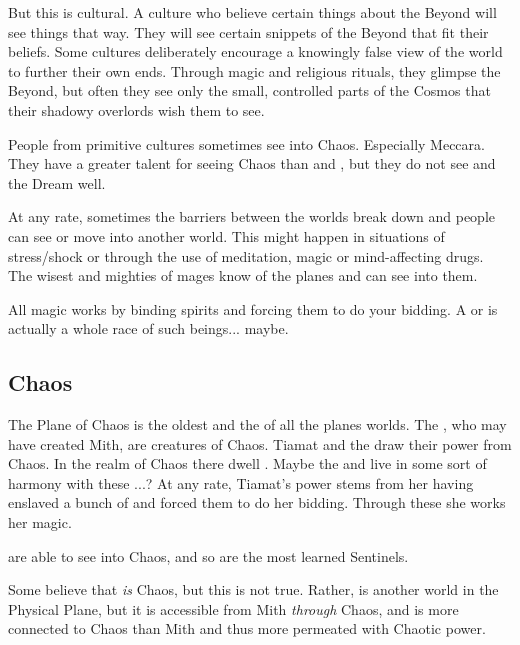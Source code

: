 But this is cultural. A culture who believe certain things about the Beyond will see things that way. They will see certain snippets of the Beyond that fit their beliefs. Some cultures deliberately encourage a knowingly false view of the world to further their own ends. Through magic and religious rituals, they glimpse the Beyond, but often they see only the small, controlled parts of the Cosmos that their shadowy overlords wish them to see. 

People from primitive cultures sometimes see into Chaos. Especially Meccara. They have a greater talent for seeing Chaos than \humans{} and \scathae{}, but they do not see \Nyx{} and the Dream well. 


At any rate, sometimes the barriers between the worlds break down and people can see or move into another world. This might happen in situations of stress/shock or through the use of meditation, magic or mind-affecting drugs. The wisest and mighties of mages know of the planes and can see into them. 

All magic works by binding spirits and forcing them to do your bidding. A \Sephirah{} or \Kliffah{} is actually a whole race of such beings... maybe. 

\subsection{Chaos}
The Plane of Chaos is the oldest and the  of all the planes worlds. 
The \krakens{}, who may have created Mith, are creatures of Chaos. Tiamat and the \Dominators{} draw their power from Chaos. In the realm of Chaos there dwell \daemons{}. Maybe the \nagae{} and \leviathans{} live in some sort of harmony with these \daemons{}...? At any rate, Tiamat's power stems from her having enslaved a bunch of \daemons{} and forced them to do her bidding. Through these \daemons{} she works her magic. 

\dragons{} are able to see into Chaos, and so are the most learned Sentinels. 

Some believe that \Makai{} \emph{is} Chaos, but this is not true. Rather, \Makai{} is another world in the Physical Plane, but it is accessible from Mith \emph{through} Chaos, and \Makai{} is more connected to Chaos than Mith and thus more permeated with Chaotic power. 

